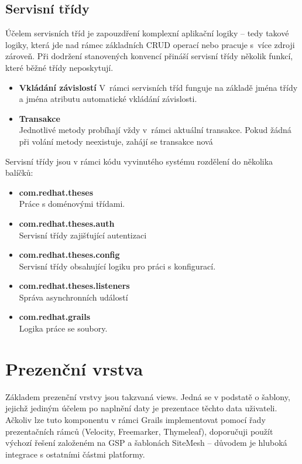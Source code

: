 \subsection{Servisní třídy}
Účelem servisních tříd je zapouzdření komplexní aplikační logiky -- tedy takové logiky, která jde nad rámec základních CRUD operací nebo pracuje s~více zdroji zároveň. Při dodržení stanovených konvencí přináší servisní třídy několik funkcí, které běžné třídy neposkytují.

\begin{itemize}
\item \textbf{Vkládání závislostí}
V~rámci servisních tříd funguje na základě jména třídy a jména atributu automatické vkládání závislosti.
\item \textbf{Transakce}\\
Jednotlivé metody probíhají vždy v~rámci aktuální transakce. Pokud žádná při volání metody neexistuje, zahájí se transakce nová
\end{itemize}

Servisní třídy jsou v rámci kódu vyvinutého systému rozdělení do několika balíčků:
\begin{itemize}
\item \textbf{com.redhat.theses} \\
Práce s doménovými třídami.
\item \textbf{com.redhat.theses.auth} \\
Servisní třídy zajišťující autentizaci
\item \textbf{com.redhat.theses.config} \\
Servisní třídy obsahující logiku pro práci s konfigurací.
\item \textbf{com.redhat.theses.listeners} \\
Správa asynchronních událostí
\item \textbf{com.redhat.grails} \\
Logika práce se soubory.
\end{itemize}

\section{Prezenční vrstva}
Základem prezenční vrstvy jsou takzvaná views. Jedná se v podstatě o šablony, jejichž jediným účelem po naplnění daty je prezentace těchto data uživateli. Ačkoliv lze tuto komponentu v rámci Grails implementovat pomocí řady prezentačních rámců (Velocity, Freemarker,  Thymeleaf), doporučuji použít výchozí řešení založeném na GSP a šablonách SiteMesh -- důvodem je hluboká integrace s ostatními částmi platformy.

